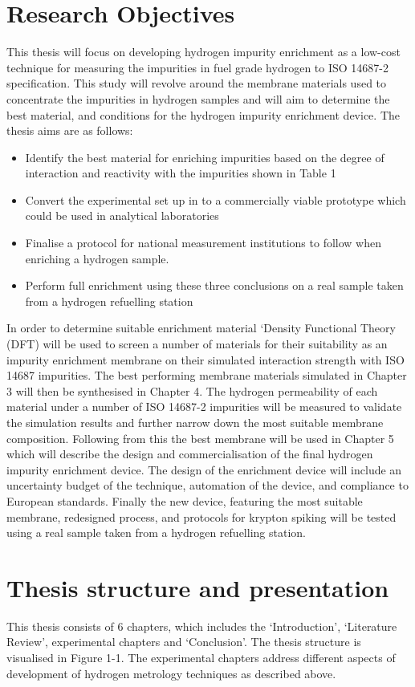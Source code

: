 \section{Research Objectives}
This thesis will focus on developing hydrogen impurity enrichment as a low-cost technique for measuring the impurities in fuel grade hydrogen to ISO 14687-2 specification. This study will revolve around the membrane materials used to concentrate the impurities in hydrogen samples and will aim to determine the best material, and conditions for the hydrogen impurity enrichment device. 
The thesis aims are as follows:
\begin{itemize}
\item Identify the best material for enriching impurities based on the degree of interaction and reactivity with the impurities shown in Table 1 
\item Convert the experimental set up in to a commercially viable prototype which could be used in analytical laboratories
\item Finalise a protocol for national measurement institutions to follow when enriching a hydrogen sample. 
\item Perform full enrichment using these three conclusions on a real sample taken from a hydrogen refuelling station
\end{itemize}
In order to determine suitable enrichment material ‘Density Functional Theory (DFT) will be used to screen a number of materials for their suitability as an impurity enrichment membrane on their simulated interaction strength with ISO 14687 impurities. 
The best performing membrane materials simulated in Chapter 3 will then be synthesised in Chapter 4. The hydrogen permeability of each material under a number of ISO 14687-2 impurities will be measured to validate the simulation results and further narrow down the most suitable membrane composition. 
Following from this the best membrane will be used in Chapter 5 which will describe the design and commercialisation of the final hydrogen impurity enrichment device. The design of the enrichment device will include an uncertainty budget of the technique, automation of the device, and compliance to European standards.
Finally the new device, featuring the most suitable membrane, redesigned process, and protocols for krypton spiking will be tested using a real sample taken from a hydrogen refuelling station.


\section{Thesis structure and presentation}
This thesis consists of 6 chapters, which includes the ‘Introduction’, ‘Literature Review’, experimental chapters and ‘Conclusion’. The thesis structure is visualised in Figure 1-1. The experimental chapters address different aspects of development of hydrogen metrology techniques as described above. 

 \renewcommand{\bibname}{References}

